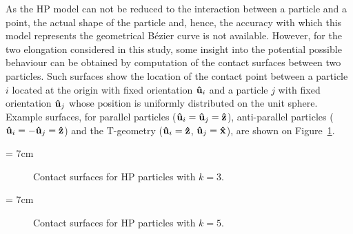 As the HP model can not be reduced to the interaction between a particle and a point, the actual
shape of the particle and, hence, the accuracy with which this model represents the geometrical
B\'ezier curve is not available. However, for the two elongation considered in this study, 
some insight into the potential possible behaviour can be obtained by computation 
of the contact surfaces between two particles. 
Such surfaces show the location of the contact point between a particle $i$ located at the origin
with fixed orientation $\mathbf{\hat{u} }_i$ and a particle $j$ with fixed orientation $\mathbf{\hat{u} }_j$ whose position
is uniformly distributed on the unit sphere. Example surfaces, for
parallel particles ($\mathbf{\hat{u} }_i=\mathbf{\hat{u} }_j=\mathbf{\hat{z} }$), anti-parallel particles ($\mathbf{\hat{u} }_i=-\mathbf{\hat{u} }_j=\mathbf{\hat{z} }$) 
and the T-geometry ($\mathbf{\hat{u} }_i=\mathbf{\hat{z} }$, $\mathbf{\hat{u} }_j=\mathbf{\hat{x} }$), are shown on 
Figure~\ref{fig:HP_k3_contactSurf}.

\picW = 7cm
\begin{figure}
	\centering
	\caption{Contact surfaces for HP particles with $k=3$.}
	\label{fig:HP_k3_contactSurf}
\end{figure}

\picW = 7cm
\begin{figure}
	\centering
	\caption{Contact surfaces for HP particles with $k=5$.}
	\label{fig:HP_k5_contactSurf}
\end{figure}

